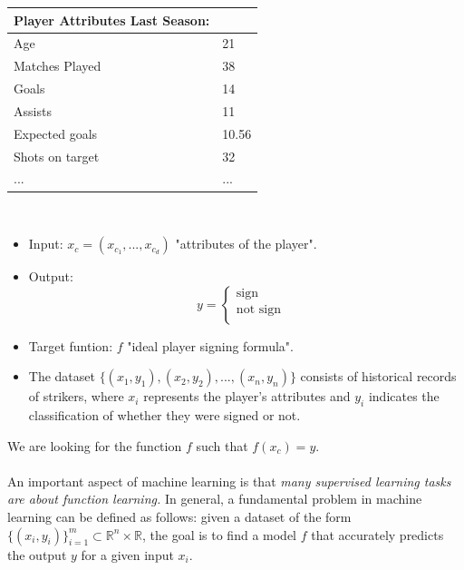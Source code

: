 \documentclass[../main.tex]{subfiles}
\begin{document}
	\begin{tabular}{ll}
		\toprule
		\textbf{Player Attributes Last Season:}  \\ 
		\midrule
		Age & 21 \\
		Matches Played & 38 \\
		Goals& 14\\
		Assists & 11\\
		Expected goals & 10.56 \\
		Shots on target& 32 \\
		... & ... \\
		\bottomrule
	\end{tabular} 
	\\ 
	\begin{itemize}
		\item Input: \textbf{$x_c=(x_{c_1},...,x_{c_d})$}  "attributes of the player". 
		\item Output:  
		\[
		y = \begin{cases}
			\text{sign} \\
			\text{not sign}& \\
		\end{cases}
		\]
		
		\item Target funtion: $f$  "ideal player signing formula".
		\item The dataset $\{(x_1, y_1), (x_2, y_2), ..., (x_n, y_n)\}$ consists of historical records of strikers, where $x_i$ represents the player's attributes and $y_i$ indicates the classification of whether they were signed or not.
	\end{itemize}
	
	\noindent We are looking for the function $f$ such that $f(x_c)=y$.
	\\ \\ 
	\noindent 
	An important aspect of machine learning is that \textit{many supervised learning tasks are about function learning.} In general, a fundamental problem in machine learning can be defined as follows: given a dataset of the form $\{(x_i,y_i)\}^m_{i=1} \subset \mathbb{R}^n \times \mathbb{R}$, the goal is to find a model $f$ that accurately predicts the output $y$ for a given input $x_i$.
	
\end{document}
